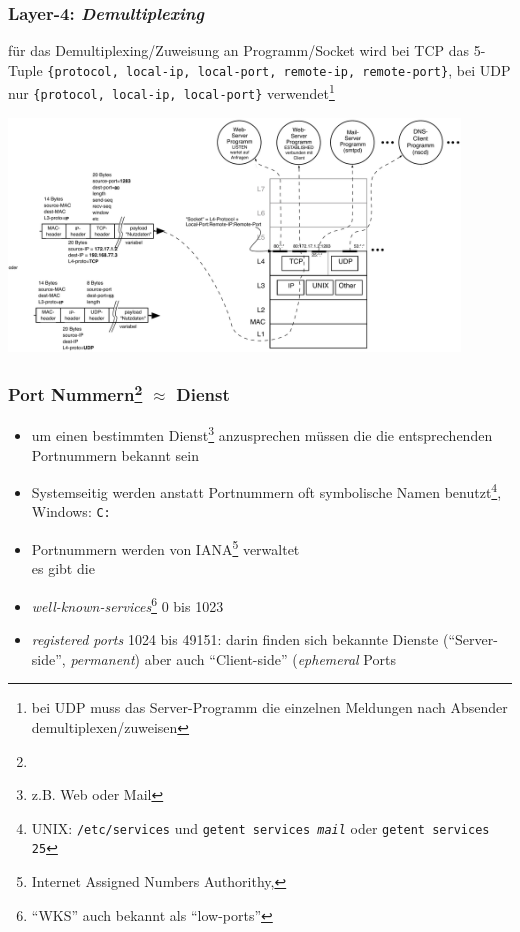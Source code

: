 \documentclass[ignorenonframetext]{beamer}
\begin{document}
\begin{frame}
\frametitle{Layer-4: {\em Demultiplexing}}
\begin{tiny}
f\"ur das Demultiplexing/Zuweisung an Programm/Socket wird
bei TCP das 5-Tuple
\texttt{\{protocol, local-ip, local-port, remote-ip, remote-port\}}, bei UDP nur \texttt{\{protocol, local-ip, local-port\}}
verwendet\footnote{bei UDP muss das Server-Programm die einzelnen Meldungen nach Absender demultiplexen/zuweisen}
\end{tiny}
\includegraphics[height=6.2cm]{demultiplexing}
\end{frame}


%


\begin{frame}
\frametitle{Port Nummern\footnote{} $\approx$ Dienst}
\begin{itemize}
	\item{um einen bestimmten Dienst\footnote{z.B. Web oder Mail} anzusprechen m\"ussen die die entsprechenden Portnummern bekannt sein}
	\item{Systemseitig werden anstatt Portnummern oft symbolische Namen benutzt\footnote{UNIX: \texttt{/etc/services} und \texttt{getent services {\em mail}} oder \texttt{getent services 25}}, Windows: \texttt{C:\\}}
	\item{Portnummern werden von IANA\footnote{Internet Assigned Numbers Authorithy,  } verwaltet}\\es gibt die
	\item[1]{{\em well-known-services}{}\footnote{``WKS'' auch bekannt als ``low-ports''} 0 bis 1023}
	\item[2]{{\em registered ports} 1024 bis 49151: darin finden sich bekannte Dienste (``Server-side'', {\em permanent}) aber auch ``Client-side'' ({\em ephemeral} Ports}
\end{itemize}
\end{frame}
\end{document}
